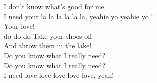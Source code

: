   I don't know what's good for me.\\
  I need your la la la la la la, yeahie yo yeahie yo !\\
  Your love!\\
  do do do
  Take your shoes off\\
  And throw them in the lake!\\
  Do you know what I really need?\\
  Do you know what I really need?\\
  I need love love love love love, yeah!\\
